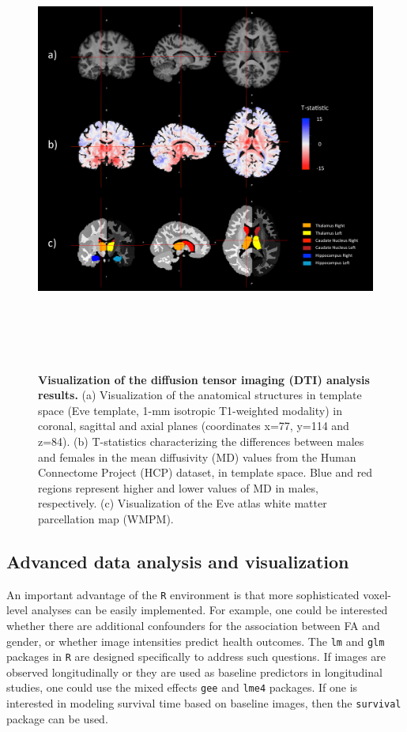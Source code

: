\documentclass[]{elsarticle} %
\begin{document}
\begin{figure}[!ht]
  \begin{center}
    \caption{\textbf{Visualization of the diffusion tensor imaging (DTI) analysis results. } (a) Visualization of the anatomical structures in template space (Eve template, 1-mm isotropic T1-weighted modality) in coronal, sagittal and axial planes (coordinates x=77, y=114 and z=84). (b) T-statistics characterizing the differences between males and females in the mean diffusivity (MD) values from the Human Connectome Project (HCP) dataset, in template space. Blue and red regions represent higher and lower values of MD in males, respectively. (c) Visualization of the Eve atlas white matter parcellation map (WMPM). } 
    \includegraphics[height=5.5in]{figure_dti.pdf}
    \label{fig:dti}
  \end{center}
\end{figure}

\subsection{Advanced data analysis and visualization}
An important advantage  of the  \texttt{R} environment  is that  more sophisticated voxel-level analyses can be easily implemented.  For  example, one could be interested  whether  there  are  additional confounders  for the association between FA and gender, or  whether  image intensities predict health outcomes. The \texttt{lm} and \texttt{glm} packages in \texttt{R} are designed specifically to address such questions. If images are observed longitudinally or they are used as baseline predictors in longitudinal studies, one could use the mixed effects \texttt{gee} \cite{gee} and \texttt{lme4} \cite{lme4} packages. If one is interested in modeling survival time based on baseline images, then the \texttt{survival} package \citep{survival-package,survival-book} can be used.
\end{document}
